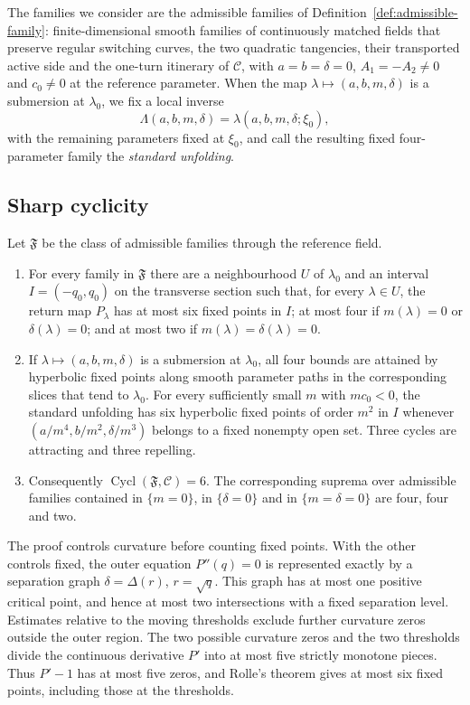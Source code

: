 The families we consider are the admissible families of
Definition~\ref{def:admissible-family}: finite-dimensional smooth families of
continuously matched fields that preserve regular switching curves, the two
quadratic tangencies, their transported active side and the one-turn itinerary
of $\mathcal C$, with
$a=b=\delta=0$, $A_1=-A_2\ne0$ and $c_0\ne0$ at the reference parameter.
When the map $\lambda\mapsto(a,b,m,\delta)$ is a submersion at
$\lambda_0$, we fix a local inverse
\[
 \Lambda(a,b,m,\delta)=\lambda(a,b,m,\delta;\xi_0),
\]
with the remaining parameters fixed at $\xi_0$, and call the resulting
fixed four-parameter family the \emph{standard unfolding}.

\subsection{Sharp cyclicity}

\begin{theorem}[Cyclicity]\label{thm:six-main}
Let $\mathfrak F$ be the class of admissible families through the reference
field.
\begin{enumerate}
\item For every family in $\mathfrak F$ there are a neighbourhood $U$ of
$\lambda_0$ and an interval $I=(-q_0,q_0)$ on the transverse section such
that, for every $\lambda\in U$, the return map $P_\lambda$ has at most six
fixed points in $I$; at most four if $m(\lambda)=0$ or $\delta(\lambda)=0$;
and at most two if $m(\lambda)=\delta(\lambda)=0$.
\item If $\lambda\mapsto(a,b,m,\delta)$ is a submersion at $\lambda_0$,
all four bounds are attained by hyperbolic fixed points along smooth
parameter paths in the corresponding slices that tend to $\lambda_0$.
For every sufficiently small $m$ with $mc_0<0$, the standard unfolding
has six hyperbolic fixed points of order $m^2$ in $I$ whenever
$(a/m^4,b/m^2,\delta/m^3)$ belongs to a fixed nonempty open set.
Three cycles are attracting and three repelling.
\item Consequently $\operatorname{Cycl}(\mathfrak F,\mathcal C)=6$. The
corresponding suprema over admissible families contained in $\{m=0\}$, in
$\{\delta=0\}$ and in $\{m=\delta=0\}$ are four, four and two.
\end{enumerate}
\end{theorem}

The proof controls curvature before counting fixed points. With the other
controls fixed, the outer equation $P''(q)=0$ is represented exactly by a
separation graph $\delta=\Delta(r)$, $r=\sqrt q$. This graph has at most one
positive critical point, and hence at most two intersections with a fixed
separation level. Estimates relative to the moving thresholds exclude
further curvature zeros outside the outer region. The two possible
curvature zeros and the two thresholds divide the continuous derivative
$P'$ into at most five strictly monotone pieces. Thus $P'-1$ has at most
five zeros, and Rolle's theorem gives at most six fixed points, including
those at the thresholds.

